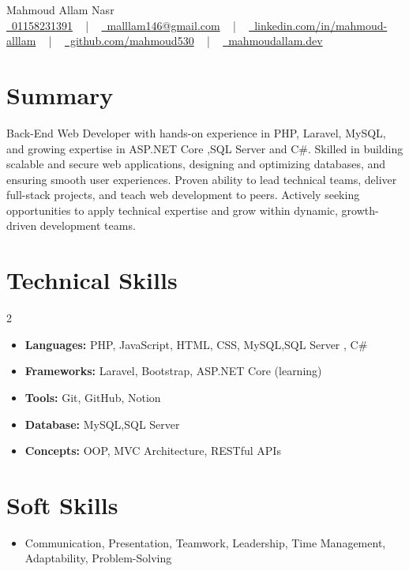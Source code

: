 \documentclass[letterpaper,10pt]{article}
\begin{document}
\begin{center}
    {\Huge\color{accentTitle} Mahmoud Allam Nasr} \\
    \href{tel:01158231391}{\faPhone\ 01158231391} ~ |
    ~ \href{mailto:malllam146@gmail.com}{\faEnvelope\ malllam146@gmail.com} ~ |
    ~ \href{https://linkedin.com/in/mahmoud-alllam}{\faLinkedin\ linkedin.com/in/mahmoud-alllam} ~ |
    ~ \href{https://github.com/mahmoud530}{\faGithub\ github.com/mahmoud530} ~ |
    ~ \href{https://mahmoud530.github.io/MyPortfolio/}{\faGlobe\ mahmoudallam.dev}
\end{center}

\section{Summary}
Back-End Web Developer with hands-on experience in PHP, Laravel, MySQL, and growing expertise in ASP.NET Core ,SQL Server and C\#. Skilled in building scalable and secure web applications, designing and optimizing databases, and ensuring smooth user experiences. Proven ability to lead technical teams, deliver full-stack projects, and teach web development to peers. Actively seeking opportunities to apply technical expertise and grow within dynamic, growth-driven development teams.

\section{Technical Skills}
\begin{multicols}{2}
  \begin{itemize}[leftmargin=10pt]
    \item \textbf{Languages:} PHP, JavaScript, HTML, CSS, MySQL,SQL Server , C\#
    \item \textbf{Frameworks:} Laravel, Bootstrap, ASP.NET Core (learning)
    \item \textbf{Tools:} Git, GitHub, Notion
    \item \textbf{Database:} MySQL,SQL Server
    \item \textbf{Concepts:} OOP, MVC Architecture, RESTful APIs
  \end{itemize}
\end{multicols}

\section{Soft Skills}
\begin{itemize}
  \item Communication, Presentation, Teamwork, Leadership, Time Management, Adaptability, Problem-Solving
\end{itemize}
\end{document}
